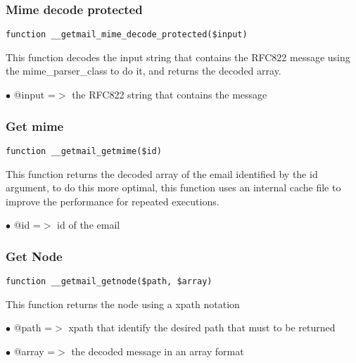 \documentclass[a4paper]{article}
\begin{document}
\hypertarget{toc82}{}
\subsubsection{Mime decode protected}

\begin{lstlisting}
function __getmail_mime_decode_protected($input)
\end{lstlisting}

This function decodes the input string that contains the RFC822 message
using the mime\_parser\_class to do it, and returns the decoded array.

\begin{compactitem}
\item[\color{myblue}$\bullet$] @input =$>$ the RFC822 string that contains the message
\end{compactitem}

\hypertarget{toc83}{}
\subsubsection{Get mime}

\begin{lstlisting}
function __getmail_getmime($id)
\end{lstlisting}

This function returns the decoded array of the email identified by the id
argument, to do this more optimal, this function uses an internal cache
file to improve the performance for repeated executions.

\begin{compactitem}
\item[\color{myblue}$\bullet$] @id =$>$ id of the email
\end{compactitem}

\hypertarget{toc84}{}
\subsubsection{Get Node}

\begin{lstlisting}
function __getmail_getnode($path, $array)
\end{lstlisting}

This function returns the node using a xpath notation

\begin{compactitem}
\item[\color{myblue}$\bullet$] @path  =$>$ xpath that identify the desired path that must to be returned
\item[\color{myblue}$\bullet$] @array =$>$ the decoded message in an array format
\end{compactitem}
\end{document}

